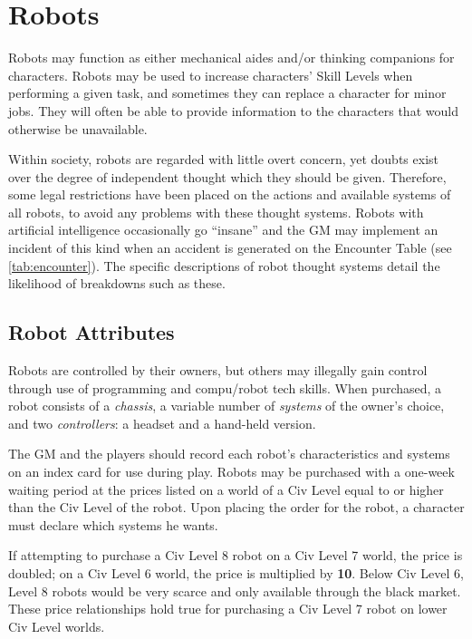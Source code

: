 \chapter{Robots}
\label{cha:robots}


Robots may function as either mechanical aides and/or thinking
companions for characters. Robots may be used to increase characters'
Skill Levels when performing a given task, and sometimes they can
replace a character for minor jobs. They will often be able to provide
information to the characters
that would otherwise be unavailable.

Within society, robots are regarded with little overt concern, yet
doubts exist over the degree of independent thought which they should
be given. Therefore, some legal restrictions have been placed on the
actions and available systems of all robots, to avoid any problems
with these thought systems. Robots with artificial intelligence
occasionally go ``insane'' and the GM may implement an incident of
this kind when an accident is generated on the Encounter Table (see
\ref{tab:encounter}). The specific descriptions of robot thought systems
detail the likelihood of breakdowns such as these.

\section{Robot Attributes}
\label{sec:robot-attributes}

Robots are controlled by their owners, but others may illegally gain
control through use of programming and compu/\linebreak[0]robot tech
skills.  When purchased, a robot consists of a \emph{chassis}, a
variable number of \emph{systems} of the owner's choice, and two
\emph{controllers}: a headset and a hand-held version.

The GM and the players should record each robot's characteristics and
systems on an index card for use during play.  Robots may be purchased
with a one-week waiting period at the prices listed on a world of a
Civ Level equal to or higher than the Civ Level of the robot. Upon
placing the order for the robot, a character must declare which
systems he wants.

If attempting to purchase a Civ Level 8 robot on a Civ Level 7 world,
the price is doubled; on a Civ Level 6 world, the price is multiplied
by \textbf{10}. Below Civ Level 6, Level 8 robots would be very scarce and only
available through the black market. These price relationships hold
true for purchasing a Civ Level 7 robot on lower Civ Level worlds. 

